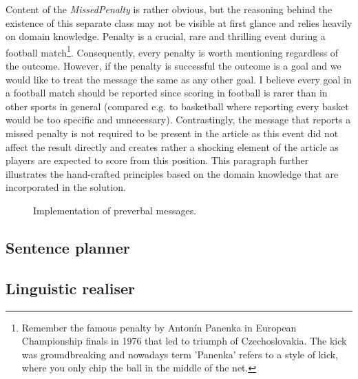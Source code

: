 Content of the \textit{MissedPenalty} is rather obvious, but the reasoning behind the existence of this separate class may not be visible at first glance and relies heavily on domain knowledge. Penalty is a crucial, rare and thrilling event during a football match\footnote{Remember the famous penalty by Antonín Panenka in European Championship finals in 1976 that led to triumph of Czechoslovakia. The kick was groundbreaking and nowadays term 'Panenka' refers to a style of kick, where you only chip the ball in the middle of the net.}. Consequently, every penalty is worth mentioning regardless of the outcome. However, if the penalty is successful the outcome is a goal and we would like to treat the message the same as any other goal. I believe every goal in a football match should be reported since scoring in football is rarer than in other sports in general (compared e.g. to basketball where reporting every basket would be too specific and unnecessary). Contrastingly, the message that reports a missed penalty is not required to be present in the article as this event did not affect the result directly and creates rather a shocking element of the article as players are expected to score from this position. This paragraph further illustrates the hand-crafted principles based on the domain knowledge that are incorporated in the solution.

\begin{figure}[h]
	\caption{Implementation of preverbal messages.}
	\label{fig:message}
\end{figure} 

\subsection{Sentence planner}

\subsection{Linguistic realiser}


